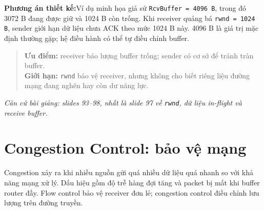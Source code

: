 \documentclass[11pt,a4paper]{article}
\newcommand{\sourcenote}[1]{\par{\small\color{muted}\textit{Căn cứ bài giảng: #1}}\par}
\newcommand{\proposallabel}{\textbf{\color{navy}Phương án thiết kế:}\enspace}
\begin{document}
\proposallabel Ví dụ minh họa giả sử \texttt{RcvBuffer = 4096 B}, trong đó 3072 B đang được giữ và 1024 B còn trống. Khi receiver quảng bá \texttt{rwnd = 1024 B}, sender giới hạn dữ liệu chưa ACK theo mức 1024 B này. 4096 B là giá trị mặc định thường gặp; hệ điều hành có thể tự điều chỉnh buffer.
\begin{quote}
\small
\textbf{Ưu điểm:} receiver báo lượng buffer trống; sender có cơ sở để tránh tràn buffer.\\
\textbf{Giới hạn:} \texttt{rwnd} bảo vệ receiver, nhưng không cho biết riêng liệu đường mạng đang nghẽn hay còn dư năng lực.
\end{quote}
\sourcenote{slides 93--98, nhất là slide 97 về \texttt{rwnd}, dữ liệu in-flight và receive buffer.}

\clearpage
\section{Congestion Control: bảo vệ mạng}
Congestion xảy ra khi nhiều nguồn gửi quá nhiều dữ liệu quá nhanh so với khả năng mạng xử lý. Dấu hiệu gồm độ trễ hàng đợi tăng và packet bị mất khi buffer router đầy. Flow control bảo vệ receiver đơn lẻ; congestion control điều chỉnh lưu lượng trên đường truyền.
\end{document}
